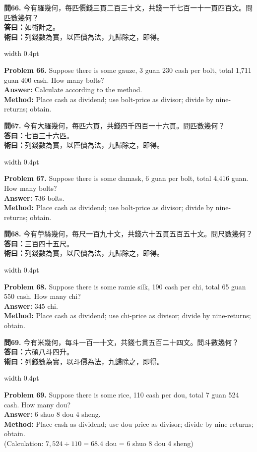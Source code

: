 \documentclass[10pt,a4paper]{article}
\newlength{\cnwidth}
\newlength{\enwidth}
\newcommand{\bilingual}[2]{%
  \noindent%
  \begin{minipage}[t]{\cnwidth}%
    #1%
  \end{minipage}%
  \hfill\vrule width 0.4pt\hfill%
  \begin{minipage}[t]{\enwidth}%
    #2%
  \end{minipage}%
  \par\smallskip%
}
\begin{document}
\bilingual{%
  \textbf{問66.}
  今有羅幾何，每匹價錢三貫二百三十文，共錢一千七百一十一貫四百文。問匹數幾何？\\
  \textbf{答曰：}如術計之。\\
  \textbf{術曰：}列錢數為實，以匹價為法，九歸除之，即得。
}{%
  \textbf{Problem 66.}
  Suppose there is some gauze, 3 guan 230 cash per bolt,
  total 1,711 guan 400 cash. How many bolts?\\
  \textbf{Answer:} Calculate according to the method.\\
  \textbf{Method:} Place cash as dividend; use bolt-price as divisor; divide by
  nine-returns; obtain.
}

\bilingual{%
  \textbf{問67.}
  今有大羅幾何，每匹六貫，共錢四千四百一十六貫。問匹數幾何？\\
  \textbf{答曰：}七百三十六匹。\\
  \textbf{術曰：}列錢數為實，以匹價為法，九歸除之，即得。
}{%
  \textbf{Problem 67.}
  Suppose there is some damask, 6 guan per bolt, total 4,416 guan.
  How many bolts?\\
  \textbf{Answer:} 736 bolts.\\
  \textbf{Method:} Place cash as dividend; use bolt-price as divisor; divide by
  nine-returns; obtain.
}

\bilingual{%
  \textbf{問68.}
  今有苧絲幾何，每尺一百九十文，共錢六十五貫五百五十文。問尺數幾何？\\
  \textbf{答曰：}三百四十五尺。\\
  \textbf{術曰：}列錢數為實，以尺價為法，九歸除之，即得。
}{%
  \textbf{Problem 68.}
  Suppose there is some ramie silk, 190 cash per chi, total 65 guan 550 cash.
  How many chi?\\
  \textbf{Answer:} 345 chi.\\
  \textbf{Method:} Place cash as dividend; use chi-price as divisor; divide by
  nine-returns; obtain.
}

\bilingual{%
  \textbf{問69.}
  今有米幾何，每斗一百一十文，共錢七貫五百二十四文。問斗數幾何？\\
  \textbf{答曰：}六碩八斗四升。\\
  \textbf{術曰：}列錢數為實，以斗價為法，九歸除之，即得。
}{%
  \textbf{Problem 69.}
  Suppose there is some rice, 110 cash per dou, total 7 guan 524 cash.
  How many dou?\\
  \textbf{Answer:} 6 shuo 8 dou 4 sheng.\\
  \textbf{Method:} Place cash as dividend; use dou-price as divisor; divide by
  nine-returns; obtain.\\
  (Calculation: $7{,}524 \div 110 = 68.4$ dou = 6 shuo 8 dou 4 sheng)
}
\end{document}
